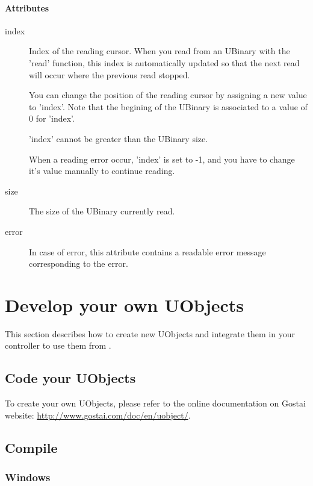 \paragraph{Attributes}

\noindent
\begin{description}
\item[index] Index of the reading cursor. When you read from an
  UBinary with the 'read' function, this index is automatically
  updated so that the next read will occur where the previous read
  stopped.

  You can change the position of the reading cursor by assigning a new
  value to 'index'. Note that the begining of the UBinary is
  associated to a value of 0 for 'index'.

  'index' cannot be greater than the UBinary size.

  When a reading error occur, 'index' is set to -1, and you have to
  change it's value manually to continue reading.

\item[size] The size of the UBinary currently read.

\item[error] In case of error, this attribute contains a readable
  error message corresponding to the error.
\end{description}


\section{Develop your own UObjects}

This section describes how to create new UObjects and integrate them
in your \urbi controller to use them from .


\subsection{Code your UObjects}

To create your own UObjects, please refer to the online documentation
on Gostai website: \url{http://www.gostai.com/doc/en/uobject/}.


\subsection{Compile}

\subsubsection{Windows}


